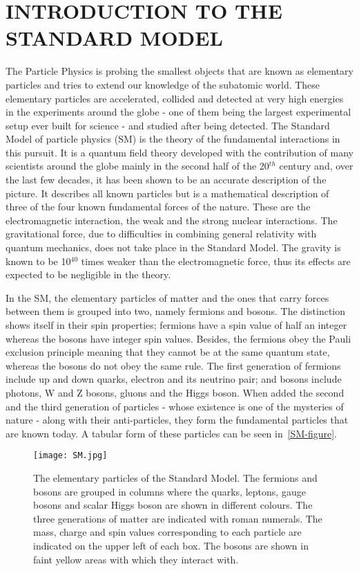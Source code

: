 \chapter{INTRODUCTION TO THE STANDARD MODEL}\label{Ch1}

The Particle Physics is probing the smallest objects that are known as elementary particles and tries to extend our knowledge of the subatomic world. These elementary particles are accelerated, collided and detected at very high energies in the experiments around the globe - one of them being the largest experimental setup ever built for science - and studied after being detected. The Standard Model of particle physics (SM) is the theory of the fundamental interactions in this pursuit. It is a quantum field theory developed with the contribution of many scientists around the globe mainly in the second half of the 20$^{th}$ century and, over the last few decades, it has been shown to be an accurate description of the picture. It describes all known particles but is a mathematical description of three of the four known fundamental forces of the nature. These are the electromagnetic interaction, the weak and the strong nuclear interactions. The gravitational force, due to difficulties in combining general relativity with quantum mechanics, does not take place in the Standard Model. The gravity is known to be 10$^{40}$ times weaker than the electromagnetic force, thus its effects are expected to be negligible in the theory.

In the SM, the elementary particles of matter and the ones that carry forces between them is grouped into two, namely fermions and bosons. The distinction shows itself in their spin properties; fermions have a spin value of half an integer whereas the bosons have integer spin values. Besides, the fermions obey the Pauli exclusion principle meaning that they cannot be at the same quantum state, whereas the bosons do not obey the same rule. The first generation of fermions include up and down quarks, electron and its neutrino pair; and bosons include photons, W and Z bosons, gluons and the Higgs boson. When added the second and the third generation of particles - whose existence is one of the mysteries of nature - along with their anti-particles, they form the fundamental particles that are known today. A tabular form of these particles can be seen in~\autoref{SM-figure}.

\vspace{6pt}
\begin{figure}[ht]
	\centering
	\texttt{[image: SM.jpg]}
	\vspace{6pt}
	\caption{The elementary particles of the Standard Model. The fermions and bosons are grouped in columns where the quarks, leptons, gauge bosons and scalar Higgs boson are shown in different colours. The three generations of matter are indicated with roman numerals. The mass, charge and spin values corresponding to each particle are indicated on the upper left of each box. The bosons are shown in faint yellow areas with which they interact with.}
	\label{SM-figure}
\end{figure}

